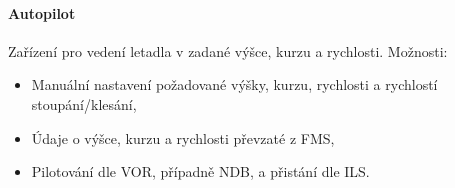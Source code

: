 \documentclass[11pt,a4paper]{article}
\theoremstyle{my-theorem}
\theoremstyle{non-theorem}
\begin{document}
\paragraph*{Autopilot} Zařízení pro vedení letadla v zadané výšce, kurzu a rychlosti. Možnosti:
\begin{itemize}
    \item Manuální nastavení požadované výšky, kurzu, rychlosti a rychlostí stoupání/klesání,
    \item Údaje o výšce, kurzu a rychlosti převzaté z FMS,
    \item Pilotování dle VOR, případně NDB, a přistání dle ILS.
\end{itemize}
\end{document}
